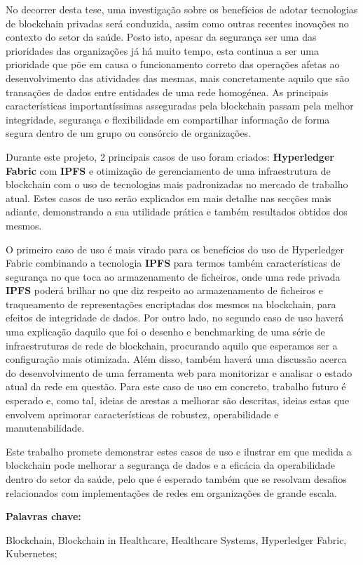 No decorrer desta tese, uma investigação sobre os benefícios de adotar tecnologias de blockchain 
privadas será conduzida, assim como outras recentes inovações no contexto do setor da saúde. Posto isto, apesar da
segurança ser uma das prioridades das organizações já há muito tempo, esta continua a ser uma prioridade que põe 
em causa o funcionamento correto das operações afetas ao desenvolvimento das atividades das mesmas, 
mais concretamente aquilo que são transações de dados entre entidades de uma rede homogénea. 
As principais características importantíssimas asseguradas pela blockchain passam pela melhor integridade, 
segurança e flexibilidade em compartilhar informação de forma segura dentro de um grupo ou consórcio de 
organizações.

Durante este projeto, 2 principais casos de uso foram criados: 
\textbf{Hyperledger Fabric} com \textbf{IPFS} e otimização de gerenciamento de uma infraestrutura 
de blockchain com o uso de tecnologias mais padronizadas no mercado de trabalho atual. 
Estes casos de uso serão explicados em mais detalhe nas secções mais adiante, 
demonstrando a sua utilidade prática e também resultados obtidos dos mesmos.

O primeiro caso de uso é mais virado para os benefícios do uso de Hyperledger Fabric 
combinando a tecnologia \textbf{IPFS} para termos também características de segurança no que toca ao 
armazenamento de ficheiros, onde uma rede privada \textbf{IPFS} poderá brilhar no que diz respeito ao 
armazenamento de ficheiros e traqueamento de representações encriptadas dos mesmos na blockchain, para efeitos 
de integridade de dados. Por outro lado, no segundo caso de uso haverá uma explicação daquilo que foi o desenho 
e benchmarking de uma série de infraestruturas de rede de blockchain, procurando aquilo que esperamos ser a 
configuração mais otimizada. Além disso, também haverá uma discussão acerca do desenvolvimento de uma ferramenta 
web para monitorizar e analisar o estado atual da rede em questão. Para este caso de uso em concreto, trabalho 
futuro é esperado e, como tal, ideias de arestas a melhorar são descritas, ideias estas que envolvem aprimorar 
características de robustez, operabilidade e manutenabilidade.

Este trabalho promete demonstrar estes casos de uso e ilustrar em que medida a blockchain pode melhorar 
a segurança de dados e a eficácia da operabilidade dentro do setor da saúde, pelo que é esperado também 
que se resolvam desafios relacionados com implementações de redes em organizações de grande escala.

\vspace{1cm} %
\textbf{Palavras chave:} \parbox[t]{0.6\textwidth}{\raggedright Blockchain, Blockchain in Healthcare, Healthcare Systems, Hyperledger Fabric, Kubernetes;}
\medskip

\pagebreak